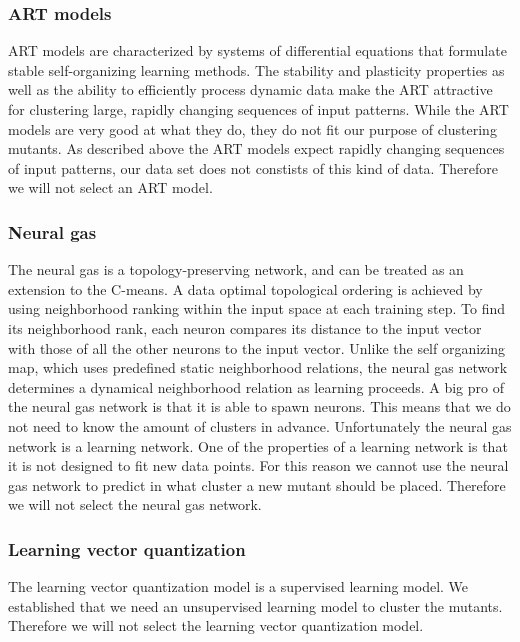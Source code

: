 \documentclass[../../main]{subfiles}
\begin{document}
\subsubsection{ART models}
ART models are characterized by systems of differential equations that formulate stable self-organizing learning methods\cite{Du2010Clustering:Approach}.
The stability and plasticity properties as well as the ability to efficiently process dynamic data make the ART attractive for clustering large, rapidly changing sequences of input patterns\cite{Du2010Clustering:Approach}.
While the ART models are very good at what they do, they do not fit our purpose of clustering mutants.
As described above the ART models expect rapidly changing sequences of input patterns, our data set does not constists of this kind of data.
Therefore we will not select an ART model.

\subsubsection{Neural gas}
The neural gas is a topology-preserving network, and can be treated as an extension to the C-means\cite{Du2010Clustering:Approach}.
A data optimal topological ordering is achieved by using neighborhood ranking within the input space at each training step\cite{Du2010Clustering:Approach}.
To find its neighborhood rank, each neuron compares its distance to the input vector with those of all the other neurons to the input vector\cite{Du2010Clustering:Approach}. 
Unlike the self organizing map, which uses predefined static neighborhood relations, the neural gas network determines a dynamical neighborhood relation as learning proceeds\cite{Du2010Clustering:Approach}.
A big pro of the neural gas network is that it is able to spawn neurons.
This means that we do not need to know the amount of clusters in advance.
Unfortunately the neural gas network is a learning network.
One of the properties of a learning network is that it is not designed to fit new data points\cite{supervisedUnsupervised}.
For this reason we cannot use the neural gas network to predict in what cluster a new mutant should be placed.
Therefore we will not select the neural gas network.

\subsubsection{Learning vector quantization}
The learning vector quantization model is a supervised learning model.
We established that we need an unsupervised learning model to cluster the mutants.
Therefore we will not select the learning vector quantization model.
\end{document}
